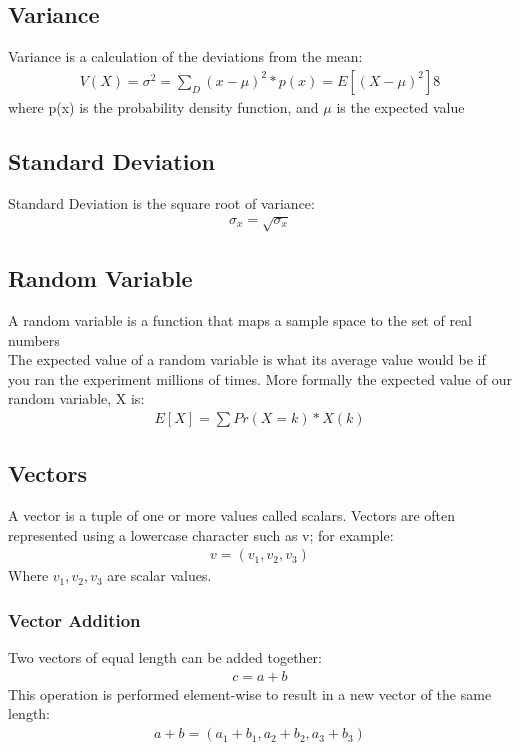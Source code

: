 \documentclass{article}
\begin{document}
\subsection{Variance}
Variance is a calculation of the deviations from the mean:\\
\begin{align*}
V(X) = \sigma^2 = \sum_D(x-\mu)^2 * p(x) = E[(X-\mu)^2]8
\end{align*}
where p(x) is the probability density function, and $\mu$ is the expected value


\subsection{Standard Deviation}
Standard Deviation is the square root of variance:\\
\begin{align*}
\sigma_x = \sqrt{\sigma_x}
\end{align*}

\subsection{Random Variable}
A random variable is a function that maps a sample space to the set of real numbers\\
The expected value of a random variable is what its average value would be if you ran the experiment millions of times. More formally the expected value of our random variable, X is:\\
\begin{align*}
E[X] = \sum{Pr(X=k) * X(k)}
\end{align*}

\subsection{Vectors}
A vector is a tuple of one or more values called scalars. Vectors are often represented using a lowercase character such as v; for example:
\begin{align*}
v = (v_1, v_2, v_3)
\end{align*}
Where $v_1, v_2, v_3$ are scalar values.

\subsubsection{Vector Addition}
Two vectors of equal length can be added together:
\begin{align*}
c = a + b
\end{align*}
This operation is performed element-wise to result in a new vector of the same length:
\begin{align*}
a + b = (a_1 + b_1, a_2 + b_2, a_3 + b_3)
\end{align*}
\end{document}
